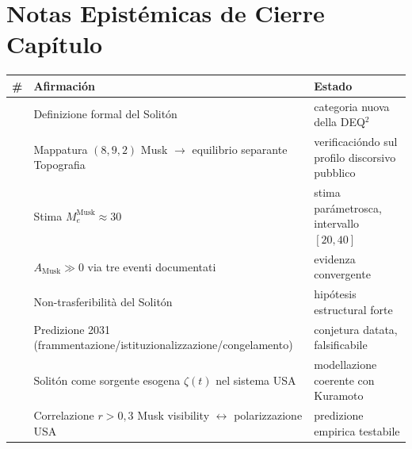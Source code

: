 \section{Notas Epistémicas de Cierre
Capítulo}\label{note-epistemiche-di-chiusura-capítulo}

{\def\LTcaptype{none} %
{\small\begin{longtable}[]{@{}
  >{\raggedright\arraybackslash}p{}
  >{\raggedright\arraybackslash}p{}
  >{\raggedright\arraybackslash}p{}@{}}
\toprule\noalign{}
\begin{minipage}[b]{\linewidth}\raggedright
\#
\end{minipage} & \begin{minipage}[b]{\linewidth}\raggedright
Afirmación
\end{minipage} & \begin{minipage}[b]{\linewidth}\raggedright
Estado
\end{minipage} \\
\midrule\noalign{}
\endhead
\bottomrule\noalign{}
\endlastfoot
1 & Definizione formal del Solitón & \Hypoth{} categoria nuova della
DEQ$^2$ \\
2 & Mappatura \((8, 9, 2)\) Musk $\to$ equilibrio separante Topografia &
\Proved{} verificacióndo sul profilo discorsivo pubblico \\
3 & Stima \(M_e^{\text{Musk}} \approx 30\) & \Conj{} stima parámetrosca,
intervallo \([20, 40]\) \\
4 & \(A_{\text{Musk}} \gg 0\) via tre eventi documentati & \Proved{}
evidenza convergente \\
5 & Non-trasferibilità del Solitón & \Hypoth{} hipótesis estructural
forte \\
6 & Predizione 2031 (frammentazione/istituzionalizzazione/congelamento)
& \Conj{} conjetura datata, falsificabile \\
7 & Solitón come sorgente esogena \(\zeta(t)\) nel sistema USA &
\Hypoth{} modellazione coerente con Kuramoto \\
8 & Correlazione \(r > 0{,}3\) Musk visibility $\leftrightarrow$ polarizzazione USA &
\Conj{} predizione empirica testabile \\
\end{longtable}}
}


